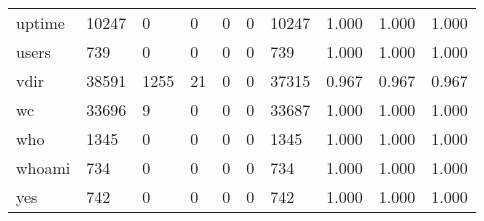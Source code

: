 \begin{longtable}{lp{2.0cm}p{2.0cm}p{2.0cm}p{2.0cm}p{2.0cm}p{2.0cm}p{2.0cm}p{2.0cm}p{2.0cm}}
uptime    &                  10247 &                                  0 &                                 0 &                                0 &                                 0 &                           10247 &                                1.000 &                                  1.000 &                                1.000 \\
users     &                    739 &                                  0 &                                 0 &                                0 &                                 0 &                             739 &                                1.000 &                                  1.000 &                                1.000 \\
vdir      &                  38591 &                               1255 &                                21 &                                0 &                                 0 &                           37315 &                                0.967 &                                  0.967 &                                0.967 \\
wc        &                  33696 &                                  9 &                                 0 &                                0 &                                 0 &                           33687 &                                1.000 &                                  1.000 &                                1.000 \\
who       &                   1345 &                                  0 &                                 0 &                                0 &                                 0 &                            1345 &                                1.000 &                                  1.000 &                                1.000 \\
whoami    &                    734 &                                  0 &                                 0 &                                0 &                                 0 &                             734 &                                1.000 &                                  1.000 &                                1.000 \\
yes       &                    742 &                                  0 &                                 0 &                                0 &                                 0 &                             742 &                                1.000 &                                  1.000 &                                1.000 \\
\end{longtable}
